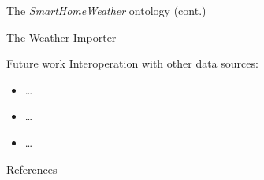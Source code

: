 \documentclass[final,hyperref={pdfpagelabels=true}]{beamer}
\newenvironment{postit}
{\begin{beamercolorbox}[sep=1em,wd=7cm]{postit}}
{\end{beamercolorbox}}
\begin{document}
\begin{frame}[fragile]
\begin{columns}[t]
\begin{column}{.45\textwidth}
\begin{block}{The \emph{SmartHomeWeather} ontology (cont.)}
	\vspace{5mm}
      \end{block}

      \begin{block}{The Weather Importer}
      \end{block}

      \begin{block}{Future work}
	Interoperation with other data sources:
	\begin{itemize}
	  \item … %
	  \item … %
	  \item … %
	\end{itemize}
      \end{block}

      \begin{block}{References}
	
	

      \end{block}
    \end{column}
  \end{columns}

  
\end{frame}
\end{document}
